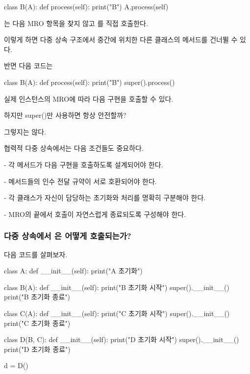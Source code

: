 \begin{dhkcode}
class B(A):
    def process(self):
        print("B")
        A.process(self)
\end{dhkcode}

는 다음 MRO 항목을 찾지 않고 를 직접 호출한다.

이렇게 하면 다중 상속 구조에서 중간에 위치한 다른 클래스의 메서드를 건너뛸 수 있다.

반면 다음 코드는

\begin{dhkcode}
class B(A):
    def process(self):
        print("B")
        super().process()
\end{dhkcode}

실제 인스턴스의 MRO에 따라 다음 구현을 호출할 수 있다.

\begin{dhknote}
\begin{dhksmry}[centered]
하지만 super()만 사용하면 항상 안전할까?
\end{dhksmry}
\end{dhknote}

그렇지는 않다.

협력적 다중 상속에서는 다음 조건들도 중요하다.

\begin{dhksmry}
- 각 메서드가 다음 구현을 호출하도록 설계되어야 한다.

- 메서드들의 인수 전달 규약이 서로 호환되어야 한다.

- 각 클래스가 자신이 담당하는 초기화와 처리를 명확히 구분해야 한다.

- MRO의 끝에서 호출이 자연스럽게 종료되도록 구성해야 한다.
\end{dhksmry}

\subsubsection{다중 상속에서 은 어떻게 호출되는가?}

다음 코드를 살펴보자.

\begin{dhkcode}
class A:
    def __init__(self):
        print("A 초기화")


class B(A):
    def __init__(self):
        print("B 초기화 시작")
        super().__init__()
        print("B 초기화 종료")


class C(A):
    def __init__(self):
        print("C 초기화 시작")
        super().__init__()
        print("C 초기화 종료")


class D(B, C):
    def __init__(self):
        print("D 초기화 시작")
        super().__init__()
        print("D 초기화 종료")

d = D()
\end{dhkcode}

